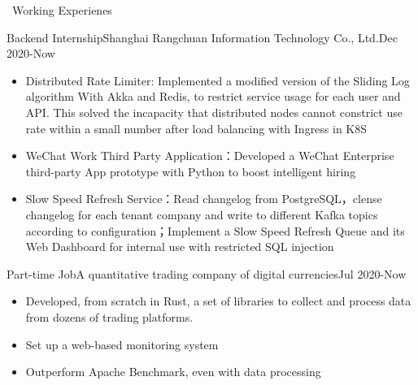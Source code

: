 \documentclass{resume} %
\begin{document}
\begin{rSection}{\faUsers~Working Experienes}
    \begin{rExperience}{Backend Internship}{Shanghai Rangchuan Information Technology Co., Ltd.}{Dec 2020-Now}
        \begin{itemize}
            \itemsep -0.5em \vspace{-0.5em}
            \item Distributed Rate Limiter: Implemented  a modified version of the Sliding Log algorithm With Akka and Redis, to restrict service usage for each user and API. This solved the incapacity that distributed nodes cannot constrict use rate within a small number after load balancing with Ingress in K8S
            \item WeChat Work Third Party Application：Developed a WeChat Enterprise third-party App prototype with Python to boost intelligent hiring
            \item Slow Speed Refresh Service：Read changelog from PostgreSQL，clense changelog for each tenant company and write to different Kafka topics according to configuration；Implement a Slow Speed Refresh Queue and its Web Dashboard for internal use with restricted SQL injection
        \end{itemize}
    \end{rExperience}
    \begin{rExperience}{Part-time Job}{A quantitative trading company of digital currencies}{Jul 2020-Now}
        \begin{itemize}
            \itemsep -0.5em \vspace{-0.5em}
            \item Developed, from scratch in Rust, a set of libraries to collect and process data from dozens of trading platforms.
            \item Set up a web-based monitoring system
            \item Outperform Apache Benchmark, even with data processing
        \end{itemize}
    \end{rExperience}

\end{rSection}
\end{document}

